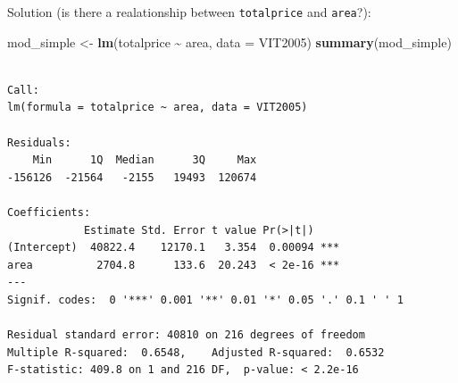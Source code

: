\documentclass[
  ignorenonframetext,
]{beamer}
\newenvironment{Shaded}{\begin{snugshade}}{\end{snugshade}}
\newcommand{\AttributeTok}[1]{\textcolor[rgb]{0.13,0.29,0.53}{#1}}
\newcommand{\FunctionTok}[1]{\textcolor[rgb]{0.13,0.29,0.53}{\textbf{#1}}}
\newcommand{\NormalTok}[1]{#1}
\newcommand{\OtherTok}[1]{\textcolor[rgb]{0.56,0.35,0.01}{#1}}
\newcommand{\SpecialCharTok}[1]{\textcolor[rgb]{0.81,0.36,0.00}{\textbf{#1}}}
\begin{document}
\begin{frame}[fragile]{Solution (is there a realationship between
\texttt{totalprice} and \texttt{area}?):}
\label{solution-is-there-a-realationship-between-totalprice-and-area-1}
\scriptsize

\begin{Shaded}
\begin{Highlighting}[]
\NormalTok{mod\_simple }\OtherTok{\textless{}{-}} \FunctionTok{lm}\NormalTok{(totalprice }\SpecialCharTok{\textasciitilde{}}\NormalTok{ area, }\AttributeTok{data =}\NormalTok{ VIT2005)}
\FunctionTok{summary}\NormalTok{(mod\_simple)}
\end{Highlighting}
\end{Shaded}

\begin{verbatim}

Call:
lm(formula = totalprice ~ area, data = VIT2005)

Residuals:
    Min      1Q  Median      3Q     Max 
-156126  -21564   -2155   19493  120674 

Coefficients:
            Estimate Std. Error t value Pr(>|t|)    
(Intercept)  40822.4    12170.1   3.354  0.00094 ***
area          2704.8      133.6  20.243  < 2e-16 ***
---
Signif. codes:  0 '***' 0.001 '**' 0.01 '*' 0.05 '.' 0.1 ' ' 1

Residual standard error: 40810 on 216 degrees of freedom
Multiple R-squared:  0.6548,    Adjusted R-squared:  0.6532 
F-statistic: 409.8 on 1 and 216 DF,  p-value: < 2.2e-16
\end{verbatim}

\normalsize
\end{frame}
\end{document}
